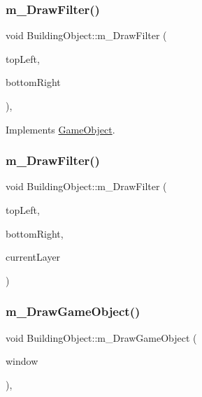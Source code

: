 \subsubsection{\texorpdfstring{m\+\_\+\+Draw\+Filter()}{m\_DrawFilter()}\hspace{0.1cm}{\footnotesize\ttfamily [1/2]}}
{\footnotesize\ttfamily void Building\+Object\+::m\+\_\+\+Draw\+Filter (\begin{DoxyParamCaption}\item[{sf\+::\+Vector2f}]{top\+Left,  }\item[{sf\+::\+Vector2f}]{bottom\+Right }\end{DoxyParamCaption})\hspace{0.3cm}{\ttfamily [override]}, {\ttfamily [virtual]}}



Implements \mbox{\hyperlink{class_game_object_af1a0662ca445d878b163c4648f90259c}{Game\+Object}}.

\mbox{\label{class_building_object_a54130a69a81268544ca715275f52bfb7}} 
\subsubsection{\texorpdfstring{m\+\_\+\+Draw\+Filter()}{m\_DrawFilter()}\hspace{0.1cm}{\footnotesize\ttfamily [2/2]}}
{\footnotesize\ttfamily void Building\+Object\+::m\+\_\+\+Draw\+Filter (\begin{DoxyParamCaption}\item[{sf\+::\+Vector2f}]{top\+Left,  }\item[{sf\+::\+Vector2f}]{bottom\+Right,  }\item[{int}]{current\+Layer }\end{DoxyParamCaption})}

\mbox{\label{class_building_object_a7e343d32ad1f6aaed5ed484b2aabe700}} 
\subsubsection{\texorpdfstring{m\+\_\+\+Draw\+Game\+Object()}{m\_DrawGameObject()}}
{\footnotesize\ttfamily void Building\+Object\+::m\+\_\+\+Draw\+Game\+Object (\begin{DoxyParamCaption}\item[{sf\+::\+Render\+Window \&}]{window }\end{DoxyParamCaption})\hspace{0.3cm}{\ttfamily [override]}, {\ttfamily [virtual]}}




